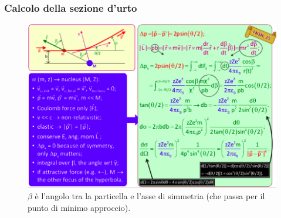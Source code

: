     \subsubsection{Calcolo della sezione d'urto}
    \begin{figure}[H]
        \centering
        \includegraphics[width=\textwidth]{immagini/fig_rutherford_math.png}
        \caption{$\beta$ è l'angolo tra la particella e l'asse di simmetria (che passa per il punto di minimo approccio).}
    \end{figure}
